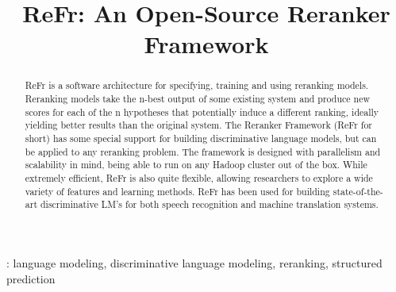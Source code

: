 \documentclass[a4paper]{article}
\title{ReFr: An Open-Source Reranker Framework}
\begin{document}
\maketitle
%
\begin{abstract}

ReFr is a software architecture for specifying, training and using
reranking models. Reranking models take the n-best output of some
existing system and produce new scores for each of the n hypotheses
that potentially induce a different ranking, ideally yielding better
results than the original system. The Reranker Framework (ReFr for
short) has some special support for building discriminative language
models, but can be applied to any reranking problem.  The framework is
designed with parallelism and scalability in mind, being able to run
on any Hadoop cluster out of the box.  While extremely efficient, ReFr
is also quite flexible, allowing researchers to explore a wide variety
of features and learning methods.  ReFr has been used for building
state-of-the-art discriminative LM's for both speech recognition and
machine translation systems.



\end{abstract}
: language modeling, discriminative language modeling, reranking, structured prediction
\end{document}
